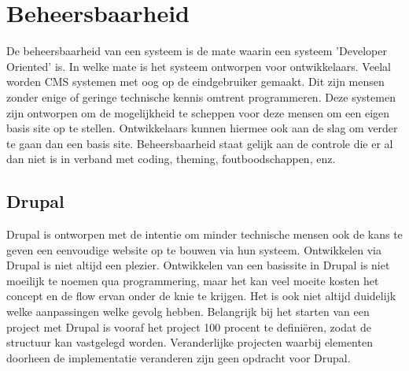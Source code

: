 \section{Beheersbaarheid}
De beheersbaarheid van een systeem is de mate waarin een systeem 'Developer Oriented' is. In welke mate is het systeem ontworpen voor ontwikkelaars. Veelal worden CMS systemen met oog op de eindgebruiker gemaakt. Dit zijn mensen zonder enige of geringe technische kennis omtrent programmeren. Deze systemen zijn ontworpen om de mogelijkheid te scheppen voor deze mensen om een eigen basis site op te stellen. Ontwikkelaars kunnen hiermee ook aan de slag om verder te gaan dan een basis site. Beheersbaarheid staat gelijk aan de controle die er al dan niet is in verband met coding, theming, foutboodschappen, enz.

\subsection{Drupal}
Drupal is ontworpen met de intentie om minder technische mensen ook de kans te geven een eenvoudige website op te bouwen via hun systeem. Ontwikkelen via Drupal is niet altijd een plezier. Ontwikkelen van een basissite in Drupal is niet moeilijk te noemen qua programmering, maar het kan veel moeite kosten het concept en de flow ervan onder de knie te krijgen. Het is ook niet altijd duidelijk welke aanpassingen welke gevolg hebben.
\newline\newline
Belangrijk bij het starten van een project met Drupal is vooraf het project 100 procent te definiëren, zodat de structuur kan vastgelegd worden. Veranderlijke projecten waarbij elementen doorheen de implementatie veranderen zijn geen opdracht voor Drupal.
\newline\newline
